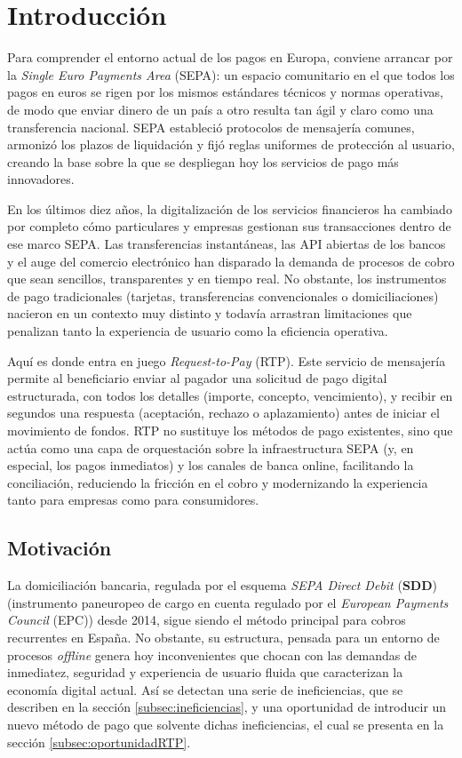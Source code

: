 \chapter{Introducción}
\label{sec:Introduccion}

Para comprender el entorno actual de los pagos en Europa, conviene arrancar por la \emph{Single Euro Payments Area} (SEPA): un espacio comunitario en el que todos los pagos en euros se rigen por los mismos estándares técnicos y normas operativas, de modo que enviar dinero de un país a otro resulta tan ágil y claro como una transferencia nacional\cite{ecb_sepa}. SEPA estableció protocolos de mensajería comunes, armonizó los plazos de liquidación y fijó reglas uniformes de protección al usuario, creando la base sobre la que se despliegan hoy los servicios de pago más innovadores.

En los últimos diez años, la digitalización de los servicios financieros ha cambiado por completo cómo particulares y empresas gestionan sus transacciones dentro de ese marco SEPA. Las transferencias instantáneas, las API abiertas de los bancos y el auge del comercio electrónico han disparado la demanda de procesos de cobro que sean sencillos, transparentes y en tiempo real. No obstante, los instrumentos de pago tradicionales (tarjetas, transferencias convencionales o domiciliaciones) nacieron en un contexto muy distinto y todavía arrastran limitaciones que penalizan tanto la experiencia de usuario como la eficiencia operativa.

Aquí es donde entra en juego \emph{Request-to-Pay} (RTP). Este servicio de mensajería permite al beneficiario enviar al pagador una solicitud de pago digital estructurada, con todos los detalles (importe, concepto, vencimiento), y recibir en segundos una respuesta (aceptación, rechazo o aplazamiento) antes de iniciar el movimiento de fondos. RTP no sustituye los métodos de pago existentes, sino que actúa como una capa de orquestación sobre la infraestructura SEPA (y, en especial, los pagos inmediatos) y los canales de banca online, facilitando la conciliación, reduciendo la fricción en el cobro y modernizando la experiencia tanto para empresas como para consumidores.

\section{Motivación}
\label{subsec:Motivacion}

La domiciliación bancaria, regulada por el esquema \textit{SEPA Direct Debit} (\textbf{SDD})\cite{epc_sdd_2025} (instrumento paneuropeo de cargo en cuenta regulado por el \emph{European Payments Council} (EPC)) desde 2014, sigue siendo el método principal para cobros recurrentes en España. No obstante, su estructura, pensada para un entorno de procesos \emph{offline} genera hoy inconvenientes que chocan con las demandas de inmediatez, seguridad y experiencia de usuario fluida que caracterizan la economía digital actual. Así se detectan una serie de ineficiencias, que se describen en la sección \ref{subsec:ineficiencias}, y una oportunidad de introducir un nuevo método de pago que solvente dichas ineficiencias, el cual se presenta en la sección \ref{subsec:oportunidadRTP}.

